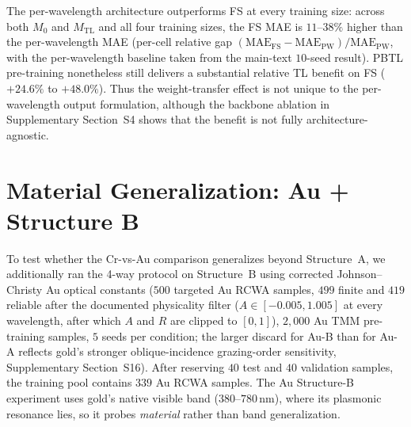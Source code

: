 \documentclass[11pt]{article}
\newcommand{\Mzero}{\ensuremath{M_0}}
\newcommand{\Mtl}{\ensuremath{M_\text{TL}}}
\newcommand{\MAE}{\text{MAE}}
\begin{document}
The per-wavelength architecture outperforms FS at every training size: across both $\Mzero$ and $\Mtl$ and all four training sizes, the FS MAE is $11$--$38\%$ higher than the per-wavelength MAE (per-cell relative gap $(\MAE_\text{FS}-\MAE_\text{PW})/\MAE_\text{PW}$, with the per-wavelength baseline taken from the main-text $10$-seed result). PBTL pre-training nonetheless still delivers a substantial relative TL benefit on FS ($+24.6\%$ to $+48.0\%$). Thus the weight-transfer effect is not unique to the per-wavelength output formulation, although the backbone ablation in Supplementary Section~S4 shows that the benefit is not fully architecture-agnostic.


\section{Material Generalization: Au + Structure B}
\label{sec:si_au_b}

To test whether the Cr-vs-Au comparison generalizes beyond Structure~A, we additionally ran the 4-way protocol on Structure~B using corrected Johnson--Christy Au optical constants ($500$ targeted Au RCWA samples, $499$ finite and $419$ reliable after the documented physicality filter ($A\in[-0.005,1.005]$ at every wavelength, after which $A$ and $R$ are clipped to $[0,1]$), $2{,}000$ Au TMM pre-training samples, $5$ seeds per condition; the larger discard for Au-B than for Au-A reflects gold's stronger oblique-incidence grazing-order sensitivity, Supplementary Section~S16). After reserving $40$ test and $40$ validation samples, the training pool contains $339$ Au RCWA samples. The Au Structure-B experiment uses gold's native visible band ($380$--$780$\,nm), where its plasmonic resonance lies, so it probes \emph{material} rather than band generalization.
\end{document}
